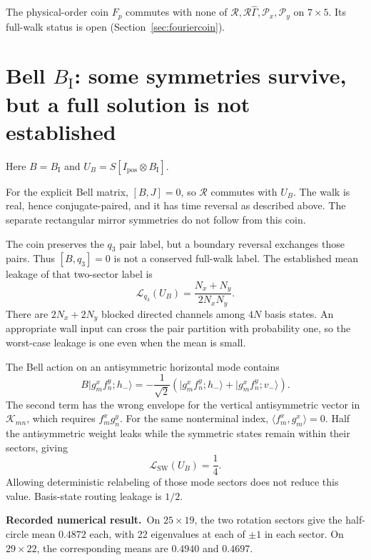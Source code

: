 \documentclass[11pt,a4paper,oneside]{report}
\newcommand{\ket}[1]{\lvert #1\rangle}
\newcommand{\Id}{I}
\newcommand{\sw}{\mathrm{SW}}
\newcommand{\recorded}{\textbf{Recorded numerical result.}\ }
\numberwithin{equation}{chapter}
\begin{document}
The physical-order coin \(F_p\) commutes with none of
\(\mathcal R,\mathcal R\widehat\Gamma,\mathcal P_x,\mathcal P_y\) on
\(7\times5\). Its full-walk status is open (Section~\ref{sec:fouriercoin}).

\section{Bell \(B_{\mathrm I}\): some symmetries survive, but a full solution is not established}
\label{sec:bellIfull}

Here \(B=B_{\mathrm I}\) and \(U_B=S[\Id_{\mathrm{pos}}\otimes B_{\mathrm I}]\).

For the explicit Bell matrix, \([B,J]=0\), so \(\mathcal R\)
commutes with \(U_B\). The walk is real, hence conjugate-paired,
and it has time reversal as described above. The separate rectangular
mirror symmetries do not follow from this coin.

The coin preserves the \(q_3\) pair label, but a boundary reversal
exchanges those pairs. Thus \([B,q_3]=0\) is not a conserved full-walk
label. The established mean leakage of that two-sector label is
\begin{equation}
\mathcal L_{q_3}(U_B)=\frac{N_x+N_y}{2N_xN_y}.
\end{equation}
There are \(2N_x+2N_y\) blocked directed channels among \(4N\)
basis states. An appropriate wall input can cross the pair partition
with probability one, so the worst-case leakage is one even when
the mean is small.

The Bell action on an antisymmetric horizontal mode contains
\begin{equation}
B\ket{g_m^x f_n^y;h_-}
=-\frac1{\sqrt2}\left(
\ket{g_m^x f_n^y;h_-}+\ket{g_m^x f_n^y;v_-}\right).
\end{equation}
The second term has the wrong envelope for the vertical antisymmetric
vector in \(\mathcal K_{mn}\), which requires \(f_m^xg_n^y\).
For the same nonterminal index,
\(\langle f_m^x,g_m^x\rangle=0\). Half the antisymmetric weight
leaks while the symmetric states remain within their sectors, giving
\begin{equation}
\boxed{\mathcal L_{\sw}(U_B)=\frac14.}
\end{equation}
Allowing deterministic relabeling of those mode sectors does not
reduce this value. Basis-state routing leakage is \(1/2\).

\recorded On \(25\times19\), the two rotation sectors give the
half-circle mean \(0.4872\) each, with 22 eigenvalues at each of
\(\pm1\) in each sector. On \(29\times22\), the corresponding
means are \(0.4940\) and \(0.4697\).
\end{document}
